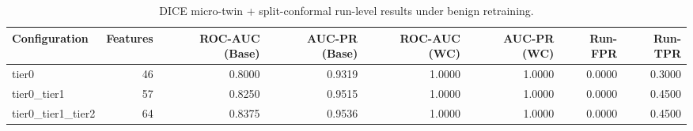 \begin{table}[t]
\centering
\caption{DICE micro-twin + split-conformal run-level results under benign retraining.}
\label{tab:dice_full_overall}
\footnotesize
\begin{tabular}{lrrrrrrr}
\toprule
Configuration & Features & ROC-AUC (Base) & AUC-PR (Base) & ROC-AUC (WC) & AUC-PR (WC) & Run-FPR & Run-TPR \\
\midrule
tier0 & 46 & 0.8000 & 0.9319 & 1.0000 & 1.0000 & 0.0000 & 0.3000 \\
tier0_tier1 & 57 & 0.8250 & 0.9515 & 1.0000 & 1.0000 & 0.0000 & 0.4500 \\
tier0_tier1_tier2 & 64 & 0.8375 & 0.9536 & 1.0000 & 1.0000 & 0.0000 & 0.4500 \\
\bottomrule
\end{tabular}

\end{table}
